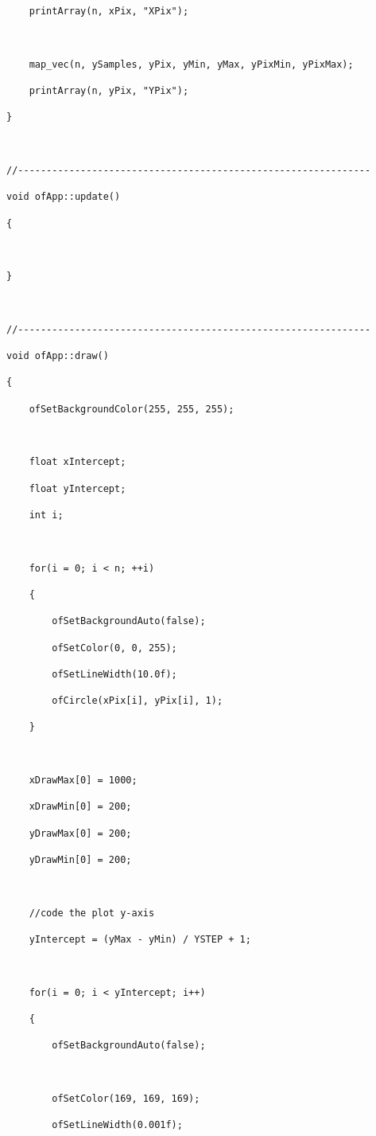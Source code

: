 \documentclass[letterpaper, 24pt, final, onecolumn, titlepage] {article}
\begin{document}
\begin{lstlisting}
    printArray(n, xPix, "XPix");



    map_vec(n, ySamples, yPix, yMin, yMax, yPixMin, yPixMax);

    printArray(n, yPix, "YPix");

}



//--------------------------------------------------------------

void ofApp::update()

{



}



//--------------------------------------------------------------

void ofApp::draw()

{

    ofSetBackgroundColor(255, 255, 255);



    float xIntercept;

    float yIntercept;

    int i;



    for(i = 0; i < n; ++i)

    {

        ofSetBackgroundAuto(false);

        ofSetColor(0, 0, 255);

        ofSetLineWidth(10.0f);

        ofCircle(xPix[i], yPix[i], 1);

    }



    xDrawMax[0] = 1000;

    xDrawMin[0] = 200;

    yDrawMax[0] = 200;

    yDrawMin[0] = 200;



    //code the plot y-axis

    yIntercept = (yMax - yMin) / YSTEP + 1;



    for(i = 0; i < yIntercept; i++)

    {

        ofSetBackgroundAuto(false);



        ofSetColor(169, 169, 169);

        ofSetLineWidth(0.001f);


\end{lstlisting}
\end{document}
